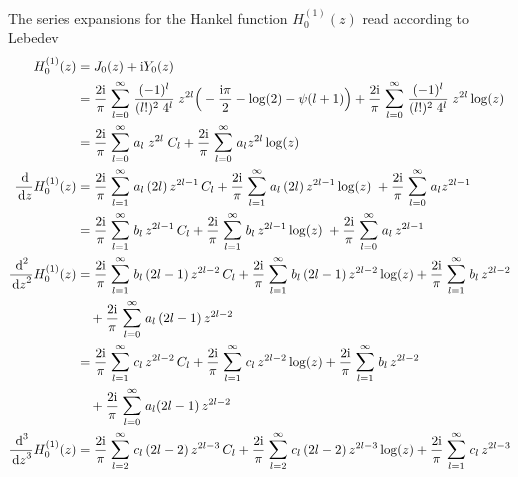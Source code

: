 The series expansions for the Hankel function $H_0^{(1)}(z)$ read according to Lebedev  \cite{lebedev}
\begin{align*}
  H_0^{(1)}(z)
  &= J_0(z) + \ii Y_0(z) \\
  &= \frac{2 \ii}{\pi} \; \mathlarger{\sum}_{l = 0}^\infty \; \frac{(-1)^l}{(l!)^2 \; 4^l} \;  z^{2l} \Big( -\frac{\ii \pi}{2} - \log(2) - \psi(l + 1) \Big) + \frac{2 \ii}{\pi} \; \mathlarger{\sum}_{l = 0}^\infty \; \frac{(-1)^l}{(l!)^2 \; 4^l} \;  z^{2l} \log(z) \\
  &= \frac{2 \ii}{\pi} \; \mathlarger{\sum}_{l = 0}^\infty \; a_l \;  z^{2l} \; C_l + \frac{2 \ii}{\pi} \; \mathlarger{\sum}_{l = 0}^\infty \; a_l z^{2l} \log(z) \\
  \frac{\d{}}{\d z} H_0^{(1)}(z)
  &= \frac{2 \ii}{\pi} \; \mathlarger{\sum}_{l = 1}^\infty \; a_l \,  (2l) \, z^{2l - 1} \, C_l + \frac{2 \ii}{\pi}  \; \mathlarger{\sum}_{l = 1}^\infty \; a_l \, (2l)  \, z^{2l - 1} \log(z) \; + \frac{2 \ii}{\pi}\; \mathlarger{\sum}_{l = 0}^\infty \; a_l z^{2l - 1} \\
  &= \frac{2 \ii}{\pi} \; \mathlarger{\sum}_{l = 1}^\infty \; b_l \, z^{2l - 1} \, C_l + \frac{2 \ii}{\pi}  \; \mathlarger{\sum}_{l = 1}^\infty \; b_l \, z^{2l - 1} \log(z) \; + \frac{2 \ii}{\pi}\; \mathlarger{\sum}_{l = 0}^\infty \; a_l \, z^{2l - 1} \\
  \frac{\d{}^2}{\d z^2} H_0^{(1)}(z)
  &= \frac{2 \ii}{\pi} \; \mathlarger{\sum}_{l = 1}^\infty \; b_l \, (2l - 1) \, z^{2l - 2} \, C_l + \frac{2 \ii}{\pi}  \; \mathlarger{\sum}_{l = 1}^\infty \; b_l \, (2l - 1)\, z^{2l - 2} \log(z) + \frac{2 \ii}{\pi} \; \mathlarger{\sum}_{l = 1}^\infty \; b_l \, z^{2l - 2} \\
  &\quad + \frac{2 \ii}{\pi}\; \mathlarger{\sum}_{l = 0}^\infty \; a_l \, (2l - 1) \, z^{2l - 2} \\
  &= \frac{2 \ii}{\pi} \; \mathlarger{\sum}_{l = 1}^\infty \; c_l \, z^{2l - 2} \, C_l + \frac{2 \ii}{\pi}  \; \mathlarger{\sum}_{l = 1}^\infty \; c_l \, z^{2l - 2} \log(z) + \frac{2 \ii}{\pi} \; \mathlarger{\sum}_{l = 1}^\infty \; b_l \, z^{2l - 2} \\
  &\quad + \frac{2 \ii}{\pi}\; \mathlarger{\sum}_{l = 0}^\infty \; a_l (2l - 1) \, z^{2l - 2} \\
  \frac{\d{}^3}{\d z^3} H_0^{(1)}(z)
  &= \frac{2 \ii}{\pi} \; \mathlarger{\sum}_{l = 2}^\infty \; c_l \, (2l - 2) \, z^{2l - 3} \, C_l + \frac{2 \ii}{\pi} \; \mathlarger{\sum}_{l = 2}^\infty \; c_l \, (2l - 2) \, z^{2l - 3} \log(z) + \frac{2 \ii}{\pi} \; \mathlarger{\sum}_{l = 1}^\infty \; c_l \, z^{2l - 3} \\

\end{align*}
